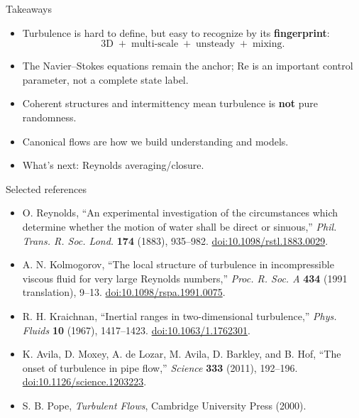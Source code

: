 \documentclass[aspectratio=169,11pt]{beamer}
\newcommand{\Rey}{\mathrm{Re}}
\begin{document}
\begin{frame}{Takeaways}
\begin{itemize}
  \item Turbulence is hard to define, but easy to recognize by its \textbf{fingerprint}:
  \[
  \text{3D} \;+\; \text{multi-scale} \;+\; \text{unsteady} \;+\; \text{mixing}.
  \]
  \item The Navier--Stokes equations remain the anchor; $\Rey$ is an important control parameter, not a complete state label.
  \item Coherent structures and intermittency mean turbulence is \textbf{not} pure randomness.
  \item Canonical flows are how we build understanding and models.
\item What's next: Reynolds averaging/closure.
\end{itemize}
\end{frame}

\begin{frame}{Selected references}
\footnotesize
\begin{itemize}
  \item O. Reynolds, ``An experimental investigation of the circumstances which determine whether the motion of water shall be direct or sinuous,'' \emph{Phil. Trans. R. Soc. Lond.} \textbf{174} (1883), 935--982. \href{https://doi.org/10.1098/rstl.1883.0029}{doi:10.1098/rstl.1883.0029}.
  \item A. N. Kolmogorov, ``The local structure of turbulence in incompressible viscous fluid for very large Reynolds numbers,'' \emph{Proc. R. Soc. A} \textbf{434} (1991 translation), 9--13. \href{https://doi.org/10.1098/rspa.1991.0075}{doi:10.1098/rspa.1991.0075}.
  \item R. H. Kraichnan, ``Inertial ranges in two-dimensional turbulence,'' \emph{Phys. Fluids} \textbf{10} (1967), 1417--1423. \href{https://doi.org/10.1063/1.1762301}{doi:10.1063/1.1762301}.
  \item K. Avila, D. Moxey, A. de Lozar, M. Avila, D. Barkley, and B. Hof, ``The onset of turbulence in pipe flow,'' \emph{Science} \textbf{333} (2011), 192--196. \href{https://doi.org/10.1126/science.1203223}{doi:10.1126/science.1203223}.
  \item S. B. Pope, \emph{Turbulent Flows}, Cambridge University Press (2000).
\end{itemize}
\end{frame}
\end{document}
